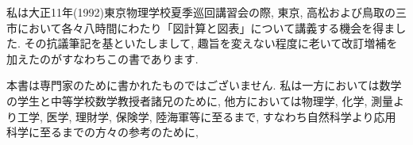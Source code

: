 私は大正11年(1992)東京物理学校夏季巡回講習会の際, 東京, 高松および鳥取の三市において各々八時間にわたり「図計算と図表」について講義する機会を得ました. その抗議筆記を基といたしまして, 趣旨を変えない程度に老いて改訂増補を加えたのがすなわちこの書であります.

本書は専門家のために書かれたものではございません. 私は一方においては数学の学生と中等学校数学教授者諸兄のために, 他方においては物理学, 化学, 測量より工学, 医学, 理財学, 保険学, 陸海軍等に至るまで, すなわち自然科学より応用科学に至るまでの方々の参考のために,

